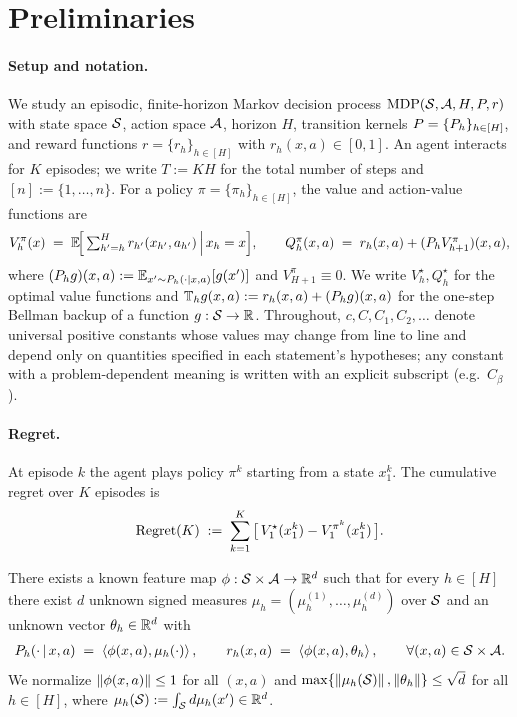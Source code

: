 \section{Preliminaries}\label{sec:prelim}

\paragraph{Setup and notation.}
We study an episodic, finite-horizon Markov decision process
$\mathrm{MDP}(\mathcal{S},\mathcal{A},H,P,r)$ with state space $\mathcal{S}$, action space $\mathcal{A}$,
horizon $H$, transition kernels $P=\{P_h\}_{h\in[H]}$, and reward
functions $r=\{r_h\}_{h\in[H]}$ with $r_h(x,a)\in[0,1]$. An agent interacts for
$K$ episodes; we write $T:=KH$ for the total number of steps and
$[n]:=\{1,\dots,n\}$. For a policy $\pi=\{\pi_h\}_{h\in[H]}$, the value and
action-value functions are
\begin{align*}
V_h^\pi(x) \;=\; \mathbb{E}\!\Big[\textstyle\sum_{h'=h}^{H} r_{h'}(x_{h'},a_{h'}) \,\Big|\, x_h=x\Big],
\qquad
Q_h^\pi(x,a) \;=\; r_h(x,a) + (P_h V_{h+1}^\pi)(x,a),
\end{align*}
where $(P_h g)(x,a):=\mathbb{E}_{x'\sim P_h(\cdot|x,a)}[g(x')]$ and
$V_{H+1}^\pi\equiv 0$. We write $V_h^\star,Q_h^\star$ for the optimal value
functions and $\mathbb{T}_h g(x,a):=r_h(x,a)+(P_h g)(x,a)$ for the one-step Bellman
backup of a function $g:\mathcal{S}\to\mathbb{R}$. Throughout, $c, C, C_1, C_2, \ldots$ denote
universal positive constants whose values may change from line to line and
depend only on quantities specified in each statement's hypotheses; any
constant with a problem-dependent meaning is written with an explicit subscript
(e.g.\ $C_\beta$).

\paragraph{Regret.}
At episode $k$ the agent plays policy $\pi^k$ starting from a state $x_1^k$. The
cumulative regret over $K$ episodes is
\begin{align}\label{eq:regret-def}
\mathrm{Regret}(K) \;:=\; \sum_{k=1}^{K}\big[\, V_1^\star(x_1^k) - V_1^{\pi^k}(x_1^k) \,\big].
\end{align}

\begin{assumption}\label{ass:linear-mdp}
There exists a known feature map $\phi:\mathcal{S}\times\mathcal{A}\to\mathbb{R}^d$ such that for
every $h\in[H]$ there exist $d$ unknown signed measures
$\mu_h=(\mu_h^{(1)},\dots,\mu_h^{(d)})$ over $\mathcal{S}$ and an unknown vector
$\theta_h\in\mathbb{R}^d$ with
\begin{align*}
P_h(\cdot\,|\,x,a) \;=\; \left\langle \phi(x,a), \mu_h(\cdot) \right\rangle,
\qquad
r_h(x,a) \;=\; \left\langle \phi(x,a), \theta_h \right\rangle,
\qquad \forall (x,a)\in\mathcal{S}\times\mathcal{A}.
\end{align*}
We normalize $\left\| \phi(x,a) \right\|\le 1$ for all $(x,a)$ and
$\max\{\left\| \mu_h(\mathcal{S}) \right\|,\left\| \theta_h \right\|\}\le\sqrt d$ for all $h\in[H]$, where
$\mu_h(\mathcal{S}):=\int_{\mathcal{S}} d\mu_h(x')\in\mathbb{R}^d$.
\end{assumption}

